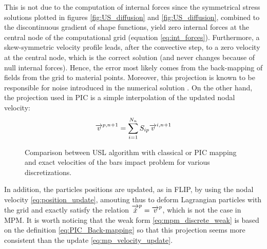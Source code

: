 This is not due to the computation of internal forces since the symmetrical stress solutions plotted in figures \ref{fig:US_diffusion} and \ref{fig:US_diffusion}, combined to the discontinuous gradient of shape functions, yield zero internal forces at the central node of the computational grid (equation \eqref{eq:int_forces}). Furthermore, a skew-symmetric velocity profile leads, after the convective step, to a zero velocity at the central node, which is the correct solution (and never changes because of null internal forces). Hence, the error most likely comes from the back-mapping of fields from the grid to material points. Moreover, this projection is known to be responsible for noise introduced in the numerical solution \cite{Mass_Flip}. On the other hand, the projection used in PIC is a simple interpolation of the updated nodal velocity:
\begin{equation}
  \label{eq:PIC_Back-mapping}
  {\overrightarrow{v}}^{p,n+1}=\sum_{i=1}^{N_n} S_{ip}{\overrightarrow{v}}^{i,n+1}
\end{equation}
\begin{figure}[ht]
  \centering
  { \label{subfig:MPM_velo_10}}
  { \label{subfig:MPM_velo_25}}
  \caption{Comparison between USL algorithm with classical or PIC mapping and exact velocities of the bars impact problem for various discretizations.}
  \label{fig:MPM_velocities}
\end{figure}
In addition, the particles positions are updated, as in FLIP, by using the nodal velocity \eqref{eq:position_update}, amouting thus to deform Lagrangian particles with the grid and exactly satisfy the relation ${\overrightarrow{\dot{x}}}^p={\overrightarrow{v}}^p$, which is not the case in MPM. It is worth noticing that the weak form \eqref{eq:mpm_discrete_weak} is based on the definition \eqref{eq:PIC_Back-mapping} so that this projection seems more consistent than the update \eqref{eq:mp_velocity_update}. 

